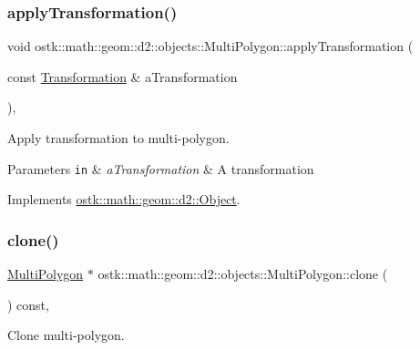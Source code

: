 \subsubsection{\texorpdfstring{apply\+Transformation()}{applyTransformation()}}
{\footnotesize\ttfamily void ostk\+::math\+::geom\+::d2\+::objects\+::\+Multi\+Polygon\+::apply\+Transformation (\begin{DoxyParamCaption}\item[{const \hyperlink{classostk_1_1math_1_1geom_1_1d2_1_1_transformation}{Transformation} \&}]{a\+Transformation }\end{DoxyParamCaption})\hspace{0.3cm}{\ttfamily [override]}, {\ttfamily [virtual]}}



Apply transformation to multi-\/polygon. 


\begin{DoxyParams}[1]{Parameters}
\mbox{\tt in}  & {\em a\+Transformation} & A transformation \\
\hline
\end{DoxyParams}


Implements \hyperlink{classostk_1_1math_1_1geom_1_1d2_1_1_object_a959e50211d7a680f7f904bbb752d75c9}{ostk\+::math\+::geom\+::d2\+::\+Object}.

\mbox{\label{classostk_1_1math_1_1geom_1_1d2_1_1objects_1_1_multi_polygon_a89fdf23e9f496c2e5f598c0dc8981c86}} 
\subsubsection{\texorpdfstring{clone()}{clone()}}
{\footnotesize\ttfamily \hyperlink{classostk_1_1math_1_1geom_1_1d2_1_1objects_1_1_multi_polygon}{Multi\+Polygon} $\ast$ ostk\+::math\+::geom\+::d2\+::objects\+::\+Multi\+Polygon\+::clone (\begin{DoxyParamCaption}{ }\end{DoxyParamCaption}) const\hspace{0.3cm}{\ttfamily [override]}, {\ttfamily [virtual]}}



Clone multi-\/polygon. 


